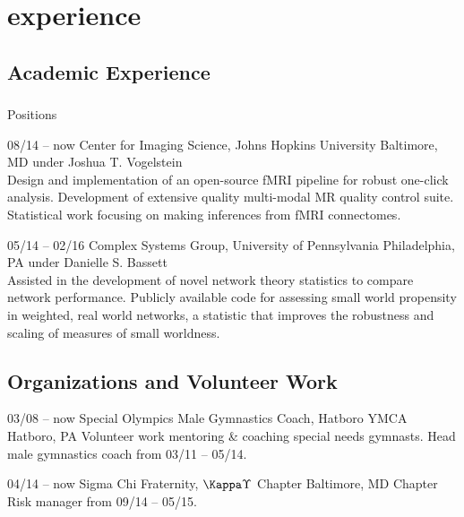 \documentclass[]{friggeri-cv} %
\begin{document}

\section{experience}

\subsection{Academic Experience}

\subsubsection{}{Positions}

\begin{entrylist}
\entry
{08/14 -- now}
{Center for Imaging Science, Johns Hopkins University}
{Baltimore, MD}
{ under Joshua T. Vogelstein\\
Design and implementation of an open-source fMRI pipeline for robust one-click analysis. Development of extensive quality multi-modal MR quality control suite. Statistical work focusing on making inferences from fMRI connectomes.}

\entry
{05/14 -- 02/16}
{Complex Systems Group, University of Pennsylvania}
{Philadelphia, PA}
{ under Danielle S. Bassett\\
Assisted in the development of novel network theory statistics to compare network performance. Publicly available code for assessing small world propensity in weighted, real world networks, a statistic that improves the robustness and scaling of measures of small worldness.}
\end{entrylist}


\subsection{Organizations and Volunteer Work}

\begin{entrylist}
\entry
{03/08 -- now}
{Special Olympics Male Gymnastics Coach, Hatboro YMCA}
{Hatboro, PA}
{Volunteer work mentoring \& coaching special needs gymnasts. Head male gymnastics coach from 03/11 -- 05/14.}

\entry
{04/14 -- now}
{Sigma Chi Fraternity, $\Kappa\Upsilon$ Chapter}
{Baltimore, MD}
{Chapter Risk manager from 09/14 -- 05/15.}

\end{entrylist}
\end{document}
